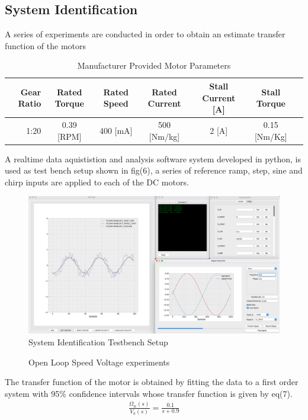         \pagebreak{}
        \subsection{System Identification}
        A series of experiments are conducted in order to obtain an estimate transfer function of the motors
        
        \begin{table}[H]
            \centering
                \begin{tabular}{|r|c|c|c|c|c|c|}
                    \hline 
                    Gear Ratio & Rated Torque & Rated Speed  & Rated Current & Stall Current [A] & Stall Torque \\
                    \hline
                     1:20  & 0.39 [RPM] & 400 [mA] & 500 [Nm/kg] & 2  [A] & 0.15 [Nm/Kg] \\
                    \hline
                \end{tabular}
                \caption{Manufacturer Provided Motor Parameters}
        \end{table}
        A realtime data aquististion and analysis software system developed in python, is used as test bench setup 
        shown in fig(6), a series of reference ramp, step, sine and chirp inputs are applied to each of the DC motors.  
        \begin{figure}[H]
            \centering
            \includegraphics[height=0.45\textwidth]{SysIDMotorSetUp.png}
            \caption{System Identification Testbench Setup}
        \end{figure}
     
        \begin{figure}[H]
            \centering
            \caption{Open Loop Speed Voltage experiments}
        \end{figure}    
        The transfer function of the motor is obtained by fitting the data to a first order system 
        with 95\% confidence intervals whose transfer function is given by eq(7).
        \begin{equation}
            \begin{aligned}
                \frac{\Omega_w \left(s\right)}{V_a \left(s\right)}=\frac{0.1}{s+0.9}
            \end{aligned}
        \end{equation}

